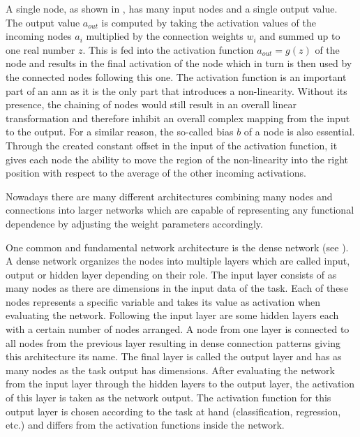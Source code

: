 A single node, as shown in , has many input nodes and a single output value. The output value \(a_{out}\) is computed by taking the activation values of the incoming nodes \(a_i\) multiplied by the connection weights \(w_i\) and summed up to one real number \(z\). This is fed into the activation function \(a_{out} = g(z)\) of the node and results in the final activation of the node which in turn is then used by the connected nodes following this one. The activation function is an important part of an \gls{ann} as it is the only part that introduces a non-linearity. Without its presence, the chaining of nodes would still result in an overall linear transformation and therefore inhibit an overall complex mapping from the input to the output. For a similar reason, the so-called bias \(b\) of a node is also essential. Through the created constant offset in the input of the activation function, it gives each node the ability to move the region of the non-linearity into the right position with respect to the average of the other incoming activations.


Nowadays there are many different architectures combining many nodes and connections into larger networks which are capable of representing any functional dependence by adjusting the weight parameters accordingly.

One common and fundamental network architecture is the dense network (see ). A dense network organizes the nodes into multiple layers which are called input, output or hidden layer depending on their role. The input layer consists of as many nodes as there are dimensions in the input data of the task. Each of these nodes represents a specific variable and takes its value as activation when eval\-u\-a\-ting the network. Following the input layer are some hidden layers each with a certain number of nodes arranged. A node from one layer is connected to all nodes from the previous layer resulting in dense connection patterns giving this architecture its name. The final layer is called the output layer and has as many nodes as the task output has dimensions. After evaluating the network from the input layer through the hidden layers to the output layer, the activation of this layer is taken as the network output. The activation function for this output layer is chosen according to the task at hand (classification, regression, etc.) and differs from the activation functions inside the network.

